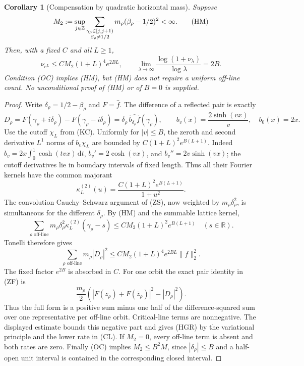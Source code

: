 \documentclass[11pt]{article}
\newtheorem{corollary}[theorem]{Corollary}
\theoremstyle{remark}\newtheorem{remark}[theorem]{Remark}
\newcommand{\R}{\mathbb R}
\newcommand{\Z}{\mathbb Z}
\newcommand{\dd}{\,\mathrm d}
\begin{document}
\begin{corollary}[Compensation by quadratic horizontal mass]
\label{cor:horizontal-mass}
Suppose
\[
 M_2:=\sup_{j\in\Z}
  \sum_{\substack{\gamma_\rho\in[j,j+1)\cr \beta_\rho\ne1/2}}
          m_\rho(\beta_\rho-1/2)^2<\infty.             \tag{HM}
\]
Then, with a fixed $C$ and all $L\ge1$,
\[
 \nu_{e^L}\le C M_2(1+L)^4e^{2BL},\qquad
 \lim_{\lambda\to\infty}
       \frac{\log(1+\nu_\lambda)}{\log\lambda}=2B.     \tag{HGR}
\]
Condition (OC) implies (HM), but (HM) does not require a
uniform off-line count. No unconditional proof of (HM)
or of $B=0$ is supplied.
\end{corollary}
\begin{proof}
Write $\delta_\rho=1/2-\beta_\rho$ and $F=\widehat f$.
The difference of a reflected pair is exactly
\[
 D_\rho=F(\gamma_\rho+i\delta_\rho)
             -F(\gamma_\rho-i\delta_\rho)
     =\delta_\rho\,\widehat{b_{\delta_\rho}f}(\gamma_\rho),
 \qquad b_v(x)=\frac{2\sinh(vx)}v,
 \quad b_0(x)=2x.
\]
Use the cutoff $\chi_L$ from (KC). Uniformly for $|v|\le B$,
the zeroth and second derivative $L^1$ norms of
$b_v\chi_L$ are bounded by
$C(1+L)^2e^{B(L+1)}$. Indeed
$b_v=2x\int_0^1\cosh(tvx)\dd t$,
$b_v'=2\cosh(vx)$, and $b_v''=2v\sinh(vx)$;
the cutoff derivatives lie in boundary intervals of fixed length.
Thus all their Fourier kernels have the common majorant
\[
 \kappa_L^{(2)}(u)=
       \frac{C(1+L)^2e^{B(L+1)}}{1+u^2}.
\]
The convolution Cauchy--Schwarz argument of (ZS), now
weighted by $m_\rho\delta_\rho^2$, is simultaneous for
the different $\delta_\rho$. By (HM) and the summable lattice kernel,
\[
 \sum_{\rho\text{ off-line}}m_\rho\delta_\rho^2
           \kappa_L^{(2)}(\gamma_\rho-s)
       \le C M_2(1+L)^2e^{B(L+1)}\quad(s\in\R).
\]
Tonelli therefore gives
\[
 \sum_{\rho\text{ off-line}}m_\rho|D_\rho|^2
       \le C M_2(1+L)^4e^{2BL}\|f\|_2^2.
\]
The fixed factor $e^{2B}$ is absorbed in $C$.
For one orbit the exact pair identity in (ZF) is
\[
 \frac{m_\rho}{2}\left(
   |F(z_\rho)+F(\bar z_\rho)|^2-|D_\rho|^2\right).
\]
Thus the full form is a positive sum minus one half of
the difference-squared sum over one representative per
off-line orbit. Critical-line terms are nonnegative.
The displayed estimate bounds this
negative part and gives (HGR) by the variational principle
and the lower rate in (CL).
If $M_2=0$, every off-line term is absent and both rates are zero.
Finally (OC) implies $M_2\le B^2M$, since
$|\delta_\rho|\le B$ and a half-open unit interval is
contained in the corresponding closed interval.
\end{proof}
\end{document}
